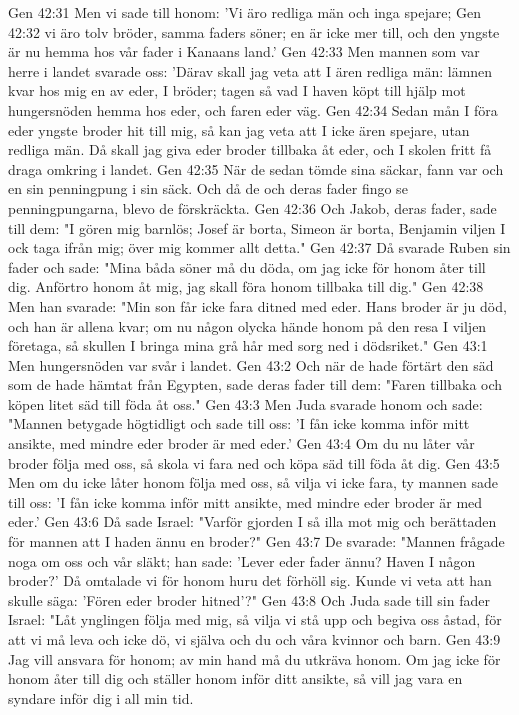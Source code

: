 Gen 42:31  Men vi sade till honom: 'Vi äro redliga män och inga spejare;
Gen 42:32  vi äro tolv bröder, samma faders söner; en är icke mer till, och den yngste är nu hemma hos vår fader i Kanaans land.'
Gen 42:33  Men mannen som var herre i landet svarade oss: 'Därav skall jag veta att I ären redliga män: lämnen kvar hos mig en av eder, I bröder; tagen så vad I haven köpt till hjälp mot hungersnöden hemma hos eder, och faren eder väg.
Gen 42:34  Sedan mån I föra eder yngste broder hit till mig, så kan jag veta att I icke ären spejare, utan redliga män. Då skall jag giva eder broder tillbaka åt eder, och I skolen fritt få draga omkring i landet.
Gen 42:35  När de sedan tömde sina säckar, fann var och en sin penningpung i sin säck. Och då de och deras fader fingo se penningpungarna, blevo de förskräckta.
Gen 42:36  Och Jakob, deras fader, sade till dem: "I gören mig barnlös; Josef är borta, Simeon är borta, Benjamin viljen I ock taga ifrån mig; över mig kommer allt detta."
Gen 42:37  Då svarade Ruben sin fader och sade: "Mina båda söner må du döda, om jag icke för honom åter till dig. Anförtro honom åt mig, jag skall föra honom tillbaka till dig."
Gen 42:38  Men han svarade: "Min son får icke fara ditned med eder. Hans broder är ju död, och han är allena kvar; om nu någon olycka hände honom på den resa I viljen företaga, så skullen I bringa mina grå hår med sorg ned i dödsriket."
Gen 43:1  Men hungersnöden var svår i landet.
Gen 43:2  Och när de hade förtärt den säd som de hade hämtat från Egypten, sade deras fader till dem: "Faren tillbaka och köpen litet säd till föda åt oss."
Gen 43:3  Men Juda svarade honom och sade: "Mannen betygade högtidligt och sade till oss: 'I fån icke komma inför mitt ansikte, med mindre eder broder är med eder.'
Gen 43:4  Om du nu låter vår broder följa med oss, så skola vi fara ned och köpa säd till föda åt dig.
Gen 43:5  Men om du icke låter honom följa med oss, så vilja vi icke fara, ty mannen sade till oss: 'I fån icke komma inför mitt ansikte, med mindre eder broder är med eder.'
Gen 43:6  Då sade Israel: "Varför gjorden I så illa mot mig och berättaden för mannen att I haden ännu en broder?"
Gen 43:7  De svarade: "Mannen frågade noga om oss och vår släkt; han sade: 'Lever eder fader ännu? Haven I någon broder?' Då omtalade vi för honom huru det förhöll sig. Kunde vi veta att han skulle säga: 'Fören eder broder hitned'?"
Gen 43:8  Och Juda sade till sin fader Israel: "Låt ynglingen följa med mig, så vilja vi stå upp och begiva oss åstad, för att vi må leva och icke dö, vi själva och du och våra kvinnor och barn.
Gen 43:9  Jag vill ansvara för honom; av min hand må du utkräva honom. Om jag icke för honom åter till dig och ställer honom inför ditt ansikte, så vill jag vara en syndare inför dig i all min tid.
